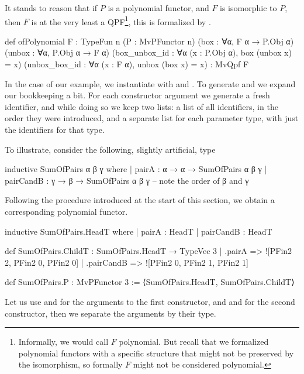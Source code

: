 It stands to reason that if $P$ is a polynomial functor, and $F$ is isomorphic to $P$, then $F$ is at
the very least a QPF\footnote{Informally, we would call $F$ polynomial. But recall that we formalized polynomial functors with a specific structure that might not be preserved by the isomorphism, so formally $F$ might not be considered polynomial.}, this is formalized by .

\pagebreak
\begin{leancode}
    def ofPolynomial {F : TypeFun n} 
                     (P : MvPFunctor n) 
                     (box    : ∀{α}, F α → P.Obj α) 
                     (unbox  : ∀{α}, P.Obj α → F α) 
                     (box_unbox_id : ∀{α} (x : P.Obj α), box (unbox x) = x)
                     (unbox_box_id : ∀{α} (x : F α), unbox (box x) = x)
                  : MvQpf F
\end{leancode}

In the case of our  example, we instantiate  with 
 and .
To generate  and  we expand our bookkeeping a bit. For each constructor argument
we generate a fresh identifier, and while doing so we keep two lists: a list of all identifiers, in 
the order they were introduced, and a separate list for each parameter type, with just the identifiers for that type.

To illustrate, consider the following, slightly artificial, type
\begin{leancode}
  inductive SumOfPairs α β γ where
    | pairA     : α → α → SumOfPairs α β γ 
    | pairCandB : γ → β → SumOfPairs α β γ   -- note the order of β and γ
\end{leancode}

Following the procedure introduced at the start of this section, we obtain a corresponding polynomial functor.
\begin{leancode}
  inductive SumOfPairs.HeadT where
    | pairA     : HeadT
    | pairCandB : HeadT

  def SumOfPairs.ChildT : SumOfPairs.HeadT → TypeVec 3
    | .pairA      => ![PFin2 2, PFin2 0, PFin2 0]
    | .pairCandB  => ![PFin2 0, PFin2 1, PFin2 1]

  def SumOfPairs.P : MvPFunctor 3 :=
    ⟨SumOfPairs.HeadT, SumOfPairs.ChildT⟩
\end{leancode}

Let us use  and  for the arguments to the first constructor, and  and 
for the second constructor, then we separate the arguments by their type.

